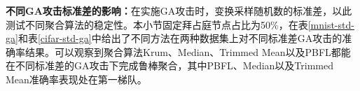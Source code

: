 \textbf{不同GA攻击标准差的影响：}在实施GA攻击时，变换采样随机数的标准差，以此测试不同聚合算法的稳定性。本小节固定拜占庭节点占比为50\%，在表\ref{mnist-std-ga}和表\ref{cifar-std-ga}中给出了不同方法在两种数据集上对不同标准差GA攻击的准确率结果。可以观察到聚合算法Krum、Median、Trimmed Mean以及PBFL都能在不同标准差的GA攻击下完成鲁棒聚合，其中PBFL、Median以及Trimmed Mean准确率表现处在第一梯队。


